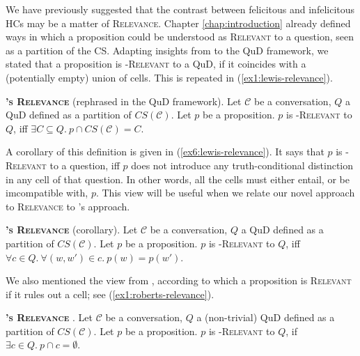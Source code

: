 We have previously suggested that the contrast between felicitous and infelicitous HCs may be a matter of \textsc{Relevance}. Chapter \ref{chap:introduction} already defined ways in which a proposition could be understood as \textsc{Relevant} to a question, seen as a partition of the CS. Adapting insights from \textcite{Lewis1988} to the QuD framework, we stated that a proposition is \textsc{\citeauthor*{Lewis1988}-Relevant} to a QuD, if it coincides with a (potentially empty) union of cells. This is repeated in (\ref{ex1:lewis-relevance}). 

\begin{exe}
	 {\textsc{\textbf{\citeauthor*{Lewis1988}'s Relevance}} (rephrased in the QuD framework). Let $\mathcal{C}$ be a conversation, $Q$ a QuD defined as a partition of $CS(\mathcal{C})$. Let $p$ be a proposition. $p$ is \textsc{\citeauthor*{Lewis1988}-Relevant} to $Q$, iff $\exists C \subseteq Q. \ p \cap CS(\mathcal{C}) = C$.}
\end{exe}

A corollary of this definition is given in (\ref{ex6:lewis-relevance}). It says that $p$ is \textsc{\citeauthor*{Lewis1988}-Relevant} to a question, iff $p$ does not introduce any truth-conditional distinction in any cell of that question. In other words, all the cells must either entail, or be imcompatible with, $p$. This view will be useful when we relate our novel approach to \textsc{Relevance} to \citeauthor*{Lewis1988}'s approach.

\begin{exe}
	\ex\label{ex6:lewis-relevance} {\textsc{\textbf{\citeauthor*{Lewis1988}'s Relevance}} (corollary). Let $\mathcal{C}$ be a conversation, $Q$ a QuD defined as a partition of $CS(\mathcal{C})$. Let $p$ be a proposition. $p$ is \textsc{\citeauthor*{Lewis1988}-Relevant} to $Q$, iff $\forall c \in Q. \ \forall (w, w') \in c. \  p(w) = p(w')$.}
\end{exe}

We also mentioned the view from \textcite{Roberts2012}, according to which a proposition is \textsc{Relevant} if it rules out a cell; see (\ref{ex1:roberts-relevance}). 

\begin{exe}
	 {\textsc{\textbf{\citeauthor{Roberts2012}'s Relevance}} \parencite{Roberts2012}. Let $\mathcal{C}$ be a conversation, $Q$ a (non-trivial) QuD defined as a partition of $CS(\mathcal{C})$. Let $p$ be a proposition. $p$ is \textsc{\citeauthor{Roberts2012}-Relevant} to $Q$, if $\exists c \in Q. \ p \cap c = \emptyset$.
	}
\end{exe}





